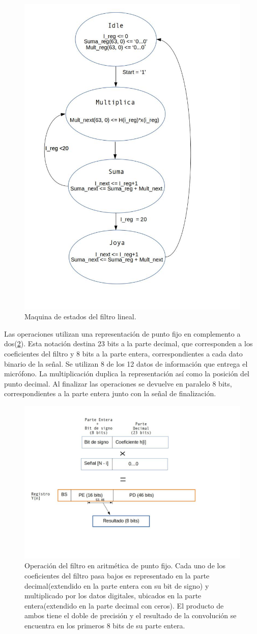 \documentclass[12pt,letterpaper]{article}
\begin{document}
\begin{figure}[H!]
  \centering
  \includegraphics[width=0.6\linewidth]{filtro_fsmd.jpg}
  \caption{Maquina de estados del filtro lineal. }
  \label{fig:filtro_fsmd}
\end{figure}

Las operaciones utilizan una representación de punto fijo en complemento a dos(\ref{fig:operacion}). Esta notación destina 23 bits a la parte decimal, que corresponden a los coeficientes del filtro y 8 bits a la parte entera, correspondientes a cada dato binario de la señal. Se utilizan 8 de los 12 datos de información que entrega el micrófono. La multiplicación duplica la representación así como la posición del punto decimal. Al finalizar las operaciones se devuelve en paralelo 8 bits, correspondientes a la parte entera junto con la señal de finalización. 

\begin{figure}[H]
  \centering
  \includegraphics[width=0.8\linewidth]{filtro_op.jpg}
  \caption{Operación del filtro en aritmética de punto fijo. Cada uno de los coeficientes del filtro pasa bajos es representado en la parte decimal(extendido en la parte entera con su bit de signo) y multiplicado por los datos digitales, ubicados en la parte entera(extendido en la parte decimal con ceros). El producto de ambos tiene el doble de precisión y el resultado de la convolución se encuentra en los primeros 8 bits de su parte entera.}
  \label{fig:operacion}
\end{figure}
\end{document}
